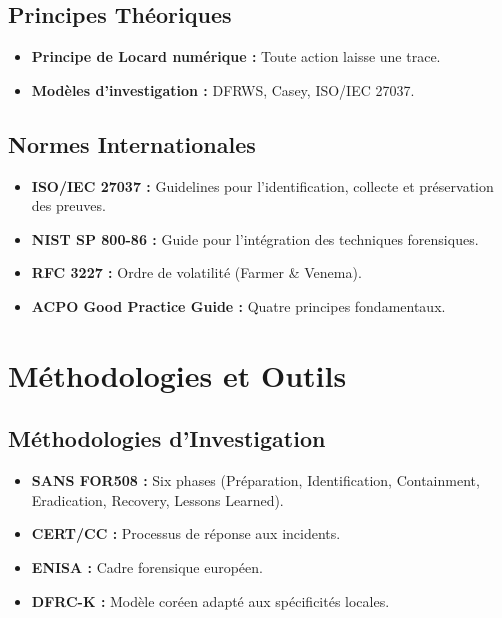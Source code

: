 \documentclass[12pt]{article}
\begin{document}
\subsection{Principes Théoriques}

\begin{itemize}
    \item \textbf{Principe de Locard numérique :} Toute action laisse une trace.
    \item \textbf{Modèles d'investigation :} DFRWS, Casey, ISO/IEC 27037.
\end{itemize}

\subsection{Normes Internationales}

\begin{itemize}
    \item \textbf{ISO/IEC 27037 :} Guidelines pour l'identification, collecte et préservation des preuves.
    \item \textbf{NIST SP 800-86 :} Guide pour l'intégration des techniques forensiques.
    \item \textbf{RFC 3227 :} Ordre de volatilité (Farmer \& Venema).
    \item \textbf{ACPO Good Practice Guide :} Quatre principes fondamentaux.
\end{itemize}

\section{Méthodologies et Outils}

\subsection{Méthodologies d'Investigation}

\begin{itemize}
    \item \textbf{SANS FOR508 :} Six phases (Préparation, Identification, Containment, Eradication, Recovery, Lessons Learned).
    \item \textbf{CERT/CC :} Processus de réponse aux incidents.
    \item \textbf{ENISA :} Cadre forensique européen.
    \item \textbf{DFRC-K :} Modèle coréen adapté aux spécificités locales.
\end{itemize}
\end{document}
